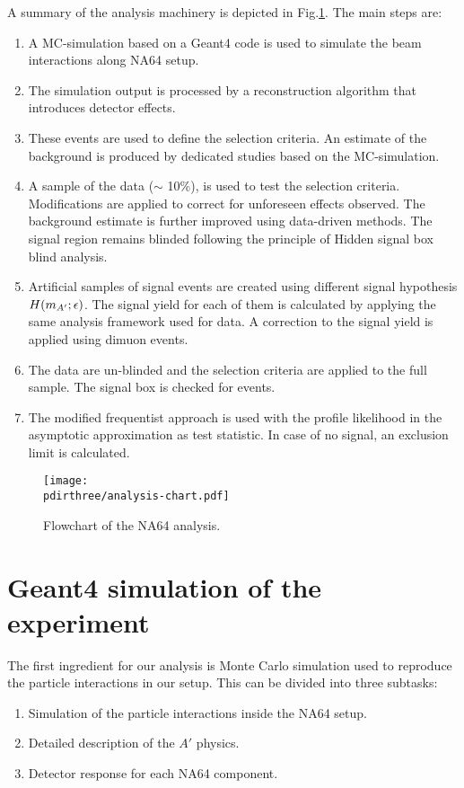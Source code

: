 A summary of the analysis machinery is depicted in Fig.\ref{fig:analysis-chart}. The main steps are:
\begin{enumerate}
\item A MC-simulation based on a Geant4 code is used to simulate the beam interactions along NA64 setup.
\item The simulation output is processed by a reconstruction algorithm that introduces detector effects.
\item These events are used to define the selection criteria. An estimate of the background is produced by dedicated studies based on the MC-simulation.
\item A sample of the data ($\sim$ 10\%), is used to test the selection criteria. Modifications are applied to correct for unforeseen effects observed. The background estimate is further improved using data-driven methods. The signal region remains blinded following the principle of Hidden signal box blind analysis.
\item Artificial samples of signal events are created using different signal hypothesis $H(m_{A'};\epsilon)$. The signal yield for each of them is calculated by applying the same analysis framework used for data. A correction to the signal yield is applied using dimuon events.
\item The data are un-blinded and the selection criteria are applied to the full sample. The signal box is checked for events.
\item The modified frequentist approach is used with the profile likelihood in the asymptotic approximation as test statistic. In case of no signal, an exclusion limit is calculated.
\end{enumerate}

\begin{figure}[bth!]
  \centering
  \texttt{[image: \\pdirthree/analysis-chart.pdf]}
  \caption{Flowchart of the NA64 analysis.}
  \label{fig:analysis-chart}
\end{figure}

\section{Geant4 simulation of the experiment}
\label{ch3:sec:geant4}

The first ingredient for our analysis is Monte Carlo simulation used to reproduce the particle interactions in our setup. This can be divided into three subtasks:
\begin{enumerate}
\item Simulation of the particle interactions inside the NA64 setup.
\item Detailed description of the $A'$ physics.  
\item Detector response for each NA64 component.  
\end{enumerate}


